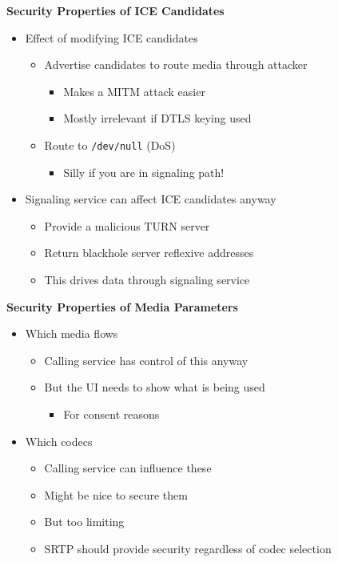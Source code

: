 \documentclass[helvetica]{seminar}
\newcommand{\heading}[1]{%
  \begin{center} 
    \large\bf 
    #1 
  \end{center} 
  \vspace{.4 in}}
\begin{document}
\begin{slide}
\heading{Security Properties of ICE Candidates}

\begin{itemize}
\item Effect of modifying ICE candidates
  \begin{itemize}
  \item Advertise candidates to route media through attacker
    \begin{itemize}
    \item Makes a MITM attack easier
    \item Mostly irrelevant if DTLS keying used
    \end{itemize}
  \item Route to \verb^/dev/null^ (DoS)
    \begin{itemize}
    \item Silly if you are in signaling path!
    \end{itemize}

  \end{itemize}

\item Signaling service can affect ICE candidates anyway
  \begin{itemize}
  \item Provide a malicious TURN server
  \item Return blackhole server reflexive addresses
  \item This drives data through signaling service
  \end{itemize}
\end{itemize}
\end{slide}



\begin{slide}
\heading{Security Properties of Media Parameters}

\begin{itemize}
\item Which media flows
  \begin{itemize}
  \item Calling service has control of this anyway
  \item But the UI needs to show what is being used
    \begin{itemize}
    \item For consent reasons
    \end{itemize}
  \end{itemize}

\item Which codecs
  \begin{itemize}
  \item Calling service can influence these
  \item Might be nice to secure them
  \item But too limiting
  \item SRTP should provide security regardless of codec selection
  \end{itemize}

\end{itemize}

\end{slide}
\end{document}
